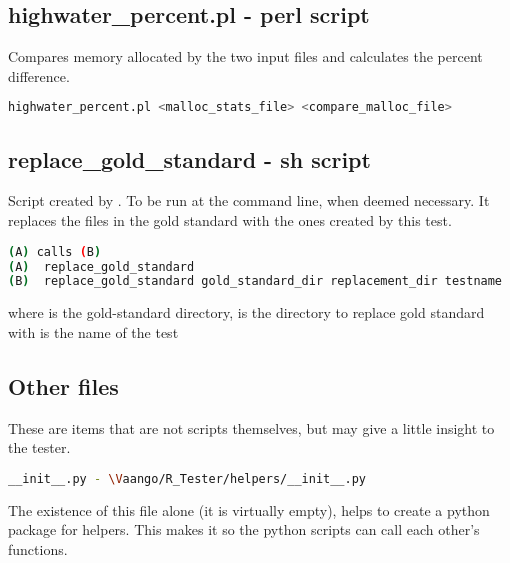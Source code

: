 \subsection{highwater\_percent.pl -  perl script}
Compares memory allocated by the two input files and calculates the 
percent difference.
\begin{lstlisting}[language=sh, backgroundcolor=\color{background}]
  highwater_percent.pl <malloc_stats_file> <compare_malloc_file>
\end{lstlisting}

\subsection{replace\_gold\_standard - sh script}
Script created by .  To be run at the command line, when deemed
necessary.  It replaces the files in the gold standard with the ones created by this test.
\begin{lstlisting}[language=sh, backgroundcolor=\color{background}]
(A) calls (B)
(A)  replace_gold_standard
(B)  replace_gold_standard gold_standard_dir replacement_dir testname
\end{lstlisting}
where  is the gold-standard directory,
 is the directory to replace gold standard with
 is the name of the test

\subsection{Other files}
These are items that are not scripts themselves, but may give a little insight
to the tester.
\begin{lstlisting}[language=sh, backgroundcolor=\color{background}]
__init__.py - \Vaango/R_Tester/helpers/__init__.py
\end{lstlisting}
The existence of this file alone (it is virtually empty), helps to create a 
python package for helpers.  This makes it so the python scripts can call each
other's functions.




